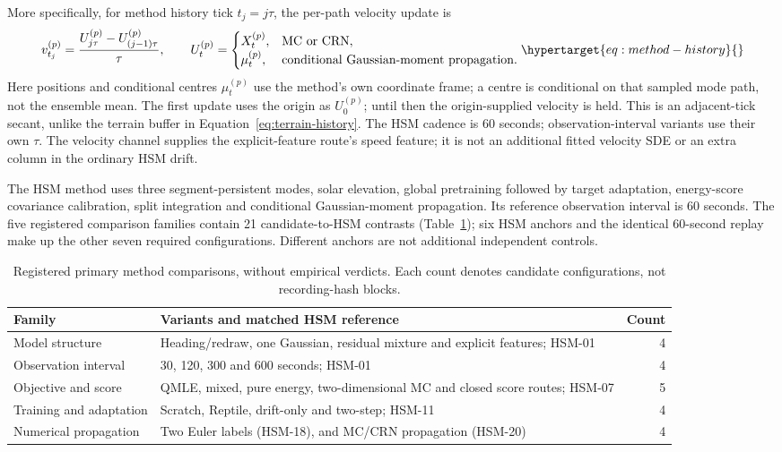 More specifically, for method history tick \(t_j=j\tau\), the per-path
velocity update is
\begin{equation}
 v^{(p)}_{t_j}=\frac{U^{(p)}_{j\tau}-U^{(p)}_{(j-1)\tau}}{\tau},\qquad
 U^{(p)}_t=\begin{cases}
 X^{(p)}_t,&\text{MC or CRN},\\
 \mu^{(p)}_t,&\text{conditional Gaussian-moment propagation}.
 \end{cases}
 \label{eq:method-history}\hypertarget{eq:method-history}{}
\end{equation}
Here positions and conditional centres \(\mu^{(p)}_t\) use the method's own
coordinate frame; a centre is conditional on that sampled mode path, not the
ensemble mean. The first update uses the origin as \(U^{(p)}_0\); until then
the origin-supplied velocity is held. This is an adjacent-tick secant, unlike
the terrain buffer in Equation~\eqref{eq:terrain-history}. The HSM cadence is
60 seconds; observation-interval variants use their own \(\tau\). The velocity
channel supplies the explicit-feature route's speed feature; it is not an
additional fitted velocity SDE or an extra column in the ordinary HSM drift.

The HSM method uses three segment-persistent modes, solar elevation, global
pretraining followed by target adaptation, energy-score covariance calibration,
split integration and conditional Gaussian-moment propagation. Its reference
observation interval is 60 seconds. The five registered comparison families
contain 21 candidate-to-HSM contrasts (Table~\ref{tab:method-families}); six
HSM anchors and the identical 60-second replay make up the other seven
required configurations. Different anchors are not additional independent controls.

\begin{table}[htbp]
\centering\small
\caption{Registered primary method comparisons, without empirical verdicts.
Each count denotes candidate configurations, not recording-hash blocks.}
\label{tab:method-families}\hypertarget{tab:method-families}{}
\begin{tabular}{p{.24\linewidth}p{.57\linewidth}r}
\hline
Family & Variants and matched HSM reference & Count\\
\hline
Model structure & Heading/redraw, one Gaussian, residual mixture and
explicit features; HSM-01 & 4\\
Observation interval & 30, 120, 300 and 600 seconds; HSM-01 & 4\\
Objective and score & QMLE, mixed, pure energy, two-dimensional MC and
closed score routes; HSM-07 & 5\\
Training and adaptation & Scratch, Reptile, drift-only and two-step;
HSM-11 & 4\\
Numerical propagation & Two Euler labels (HSM-18), and MC/CRN
propagation (HSM-20) & 4\\
\hline
\end{tabular}
\end{table}

